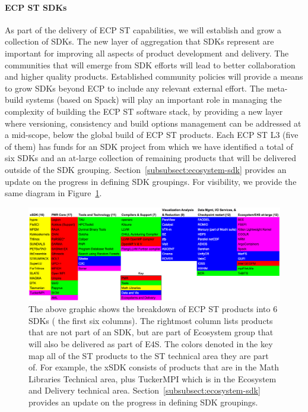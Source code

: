 \paragraph{ECP ST SDKs}
As part of the delivery of ECP ST capabilities, we will establish and grow a collection of SDKs. The new layer of aggregation that SDKs represent are important for improving all aspects of product development and delivery. The communities that will emerge from SDK efforts will lead to better collaboration and higher quality products. Established community policies will provide a means to grow SDKs beyond ECP to include any relevant external effort. The meta-build systems (based on Spack) will play an important role in managing the complexity of building the ECP ST software stack, by providing a new layer where versioning, consistency and build options management can be addressed at a mid-scope, below the global build of ECP ST products.
Each ECP ST L3 (five of them) has funds for an SDK project from which we have identified a total of six SDKs and an at-large collection of remaining products that will be delivered outside of the SDK grouping.  Section~\ref{subsubsect:ecosystem-sdk} provides an update on the progress in defining SDK groupings. For visibility, we provide the same diagram in Figure~\ref{fig:sdk-definition1-0}.

\begin{figure}[htb]
	\centering
	\includegraphics[width=6.5in]{projects/2.3.5-Ecosystem/2.3.5.01-Ecosystem-SDK/SDKdefinition1}
	\caption{\label{fig:sdk-definition1-0}The above graphic shows the breakdown of ECP ST products into 6 SDKs ( the first six columns).  The rightmost column lists products that are not part of an SDK, but are part of Ecosystem group that will also be delivered as part of E4S. The colors denoted in the key map all of the ST products to the ST technical area they are part of.  For example, the xSDK consists of products that are in the Math Libraries Technical area, plus TuckerMPI which is in the Ecosystem and Delivery technical area.  Section~\ref{subsubsect:ecosystem-sdk} provides an update on the progress in defining SDK groupings.}
\end{figure}


